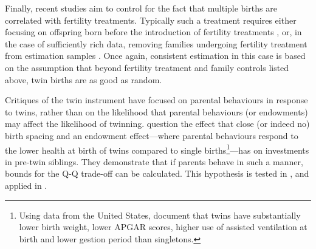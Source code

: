 Finally, recent studies aim to control for the fact that multiple births are 
correlated with fertility treatments.  Typically such a treatment requires either 
focusing on offspring born before the introduction of fertility treatments 
\citep{Caceres2006, Angristetal2010}, or, in the case of sufficiently rich data, 
removing families undergoing fertility treatment from estimation samples 
\citep{Braakman2014}.  Once again, consistent estimation in this case is based
on the assumption that beyond fertility treatment and family controls listed 
above, twin births are as good as random.

Critiques of the twin instrument have focused on parental behaviours in response
to twins, rather than on the likelihood that parental behaviours (or endowments)
may affect the likelihood of twinning.  \citet{RosenzweigZhang2009}  question the
effect that close (or indeed no) birth spacing and an endowment effect---where 
parental behaviours respond to the lower health at birth of twins compared to single 
births\footnote{Using data from the United States, \citet{Almondetal2005} document 
that twins have substantially lower birth weight, lower APGAR scores, higher use of 
assisted ventilation at birth and lower gestion period than singletons.}---has on 
investments in pre-twin siblings.  They demonstrate that if parents behave in such
a manner, bounds for the Q-Q trade-off can be calculated.  This hypothesis is 
tested in \citet{Angristetal2010}, and applied in \citet{FitzsimonsMalde2010}.




